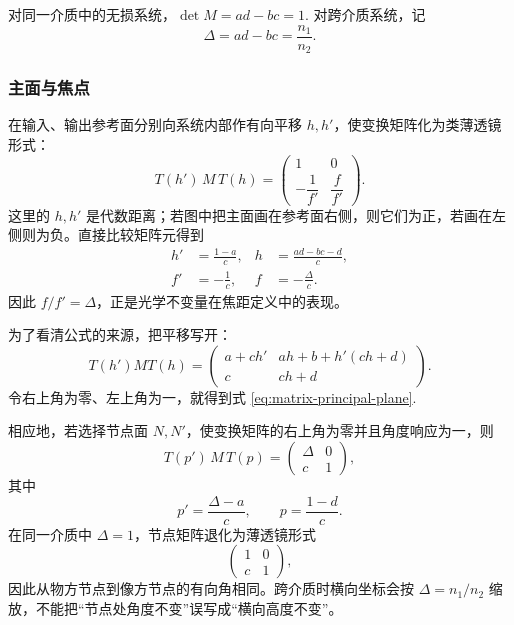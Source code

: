 对同一介质中的无损系统，\(\det M=ad-bc=1\). 对跨介质系统，记
\begin{equation}
	\Delta=ad-bc=\frac{n_1}{n_2}.
\end{equation}

\subsubsection{主面与焦点}

在输入、输出参考面分别向系统内部作有向平移 \(h,h'\)，使变换矩阵化为类薄透镜形式：
\begin{equation}
	T(h')\,M\,T(h)
	=
	\begin{pmatrix}
		1&0\\[2pt]-\dfrac{1}{f'}&\dfrac{f}{f'}
	\end{pmatrix}.
\end{equation}
这里的 \(h,h'\) 是代数距离；若图中把主面画在参考面右侧，则它们为正，若画在左侧则为负。直接比较矩阵元得到
\begin{align}
	h'&=\frac{1-a}{c},&
h&=\frac{ad-bc-d}{c},\label{eq:matrix-principal-plane}\\
	f'&=-\frac{1}{c},&
	f&=-\frac{\Delta}{c}.\label{eq:matrix-focal-length}
\end{align}
因此 \(f/f'=\Delta\)，正是光学不变量在焦距定义中的表现。

为了看清公式的来源，把平移写开：
\begin{equation}
	T(h')MT(h)=
	\begin{pmatrix}
	a+ch'&ah+b+h'(ch+d)\\
	c&ch+d
	\end{pmatrix}.
\end{equation}
令右上角为零、左上角为一，就得到式 \eqref{eq:matrix-principal-plane}.

相应地，若选择节点面 \(N,N'\)，使变换矩阵的右上角为零并且角度响应为一，则
\begin{equation}
	T(p')\,M\,T(p)=
	\begin{pmatrix}
		\Delta&0\\ c&1
	\end{pmatrix},
\end{equation}
其中
\begin{equation}
	p'=\frac{\Delta-a}{c},\qquad
	p=\frac{1-d}{c}.
\end{equation}
在同一介质中 \(\Delta=1\)，节点矩阵退化为薄透镜形式
\[
	\begin{pmatrix}1&0\\c&1\end{pmatrix},
\]
因此从物方节点到像方节点的有向角相同。跨介质时横向坐标会按 \(\Delta=n_1/n_2\) 缩放，不能把“节点处角度不变”误写成“横向高度不变”。

